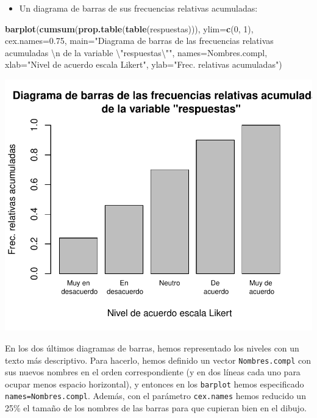 \documentclass[
]{book}
\newenvironment{Shaded}{\begin{snugshade}}{\end{snugshade}}
\newcommand{\CharTok}[1]{\textcolor[rgb]{0.31,0.60,0.02}{#1}}
\newcommand{\DataTypeTok}[1]{\textcolor[rgb]{0.13,0.29,0.53}{#1}}
\newcommand{\DecValTok}[1]{\textcolor[rgb]{0.00,0.00,0.81}{#1}}
\newcommand{\FloatTok}[1]{\textcolor[rgb]{0.00,0.00,0.81}{#1}}
\newcommand{\KeywordTok}[1]{\textcolor[rgb]{0.13,0.29,0.53}{\textbf{#1}}}
\newcommand{\NormalTok}[1]{#1}
\newcommand{\StringTok}[1]{\textcolor[rgb]{0.31,0.60,0.02}{#1}}
\providecommand{\tightlist}{%
  \setlength{\itemsep}{0pt}\setlength{\parskip}{0pt}}
\theoremstyle{definition}
\theoremstyle{definition}
\theoremstyle{definition}
\theoremstyle{remark}
\begin{document}
\begin{itemize}
\tightlist
\item
  Un diagrama de barras de sus frecuencias relativas acumuladas:
\end{itemize}

\begin{Shaded}
\begin{Highlighting}[]
\KeywordTok{barplot}\NormalTok{(}\KeywordTok{cumsum}\NormalTok{(}\KeywordTok{prop.table}\NormalTok{(}\KeywordTok{table}\NormalTok{(respuestas))), }\DataTypeTok{ylim=}\KeywordTok{c}\NormalTok{(}\DecValTok{0}\NormalTok{, }\DecValTok{1}\NormalTok{), }\DataTypeTok{cex.names=}\FloatTok{0.75}\NormalTok{,}
  \DataTypeTok{main=}\StringTok{"Diagrama de barras de las frecuencias relativas acumuladas }\CharTok{\textbackslash{}n}\StringTok{ de la variable }\CharTok{\textbackslash{}"}\StringTok{respuestas}\CharTok{\textbackslash{}"}\StringTok{"}\NormalTok{, }
  \DataTypeTok{names=}\NormalTok{Nombres.compl, }\DataTypeTok{xlab=}\StringTok{"Nivel de acuerdo escala Likert"}\NormalTok{, }\DataTypeTok{ylab=}\StringTok{"Frec. relativas acumuladas"}\NormalTok{)}
\end{Highlighting}
\end{Shaded}

\begin{center}\includegraphics[width=0.9\linewidth]{11chap11_Descripcion_ordinales_files/figure-latex/unnamed-chunk-15-1} \end{center}

En los dos últimos diagramas de barras, hemos representado los niveles con un texto más descriptivo. Para hacerlo, hemos definido un vector \texttt{Nombres.compl} con sus nuevos nombres en el orden correspondiente (y en dos líneas cada uno para ocupar menos espacio horizontal), y entonces en los \texttt{barplot} hemos especificado \texttt{names=Nombres.compl}. Además, con el parámetro \texttt{cex.names} hemos reducido un 25\% el tamaño de los nombres de las barras para que cupieran bien en el dibujo.
\end{document}
